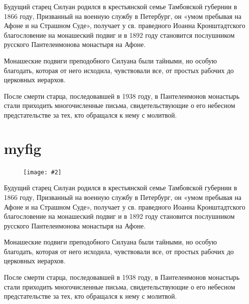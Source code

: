 \documentclass[12pt,a4paper]{article}
\newcommand{\myfigr}[2][0.43]{
\begin{figure}
\texttt{[image: \#2]}
\end{figure}
}
\begin{document}
Будущий старец Силуан родился в крестьянской семье Тамбовской губернии в 1866 году, Призванный на военную службу в Петербург, он «умом пребывая на Афоне и на Страшном Суде», получает у св. праведного Иоанна Кронштадтского благословение на монашеский подвиг и в 1892 году становится послушником русского Пантелеимонова монастыря на Афоне.

Монашеские подвиги преподобного Силуана были тайными, но особую благодать, которая от него исходила, чувствовали все, от простых рабочих до церковных иерархов. 

После смерти старца, последовавшей в 1938 году, в Пантелеимонов монастырь стали приходить многочисленные письма, свидетельствующие о его небесном предстательстве за тех, кто обращался к нему с молитвой.

\newpage\section{myfig}
\setlength\intextsep{0pt}
\myfigr[0.15]{img/521.jpg}

Будущий старец Силуан родился в крестьянской семье Тамбовской губернии в 1866 году, Призванный на военную службу в Петербург, он «умом пребывая на Афоне и на Страшном Суде», получает у св. праведного Иоанна Кронштадтского благословение на монашеский подвиг и в 1892 году становится послушником русского Пантелеимонова монастыря на Афоне.

Монашеские подвиги преподобного Силуана были тайными, но особую благодать, которая от него исходила, чувствовали все, от простых рабочих до церковных иерархов. 

После смерти старца, последовавшей в 1938 году, в Пантелеимонов монастырь стали приходить многочисленные письма, свидетельствующие о его небесном предстательстве за тех, кто обращался к нему с молитвой.
\end{document}
